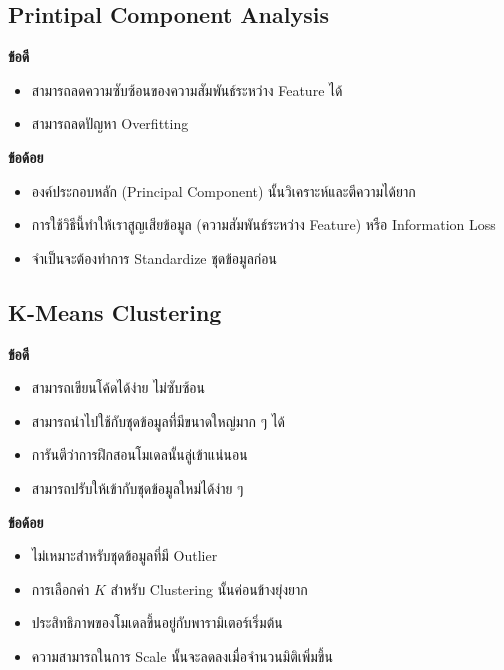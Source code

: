 \subsection{Printipal Component Analysis}
\label{ssec:pros_cons_pca}

\noindent \textbf{ข้อดี}
\begin{itemize}[topsep=0pt]
    \item สามารถลดความซับซ้อนของความสัมพันธ์ระหว่าง Feature ได้
    
    \item สามารถลดปัญหา Overfitting
\end{itemize}

\noindent \textbf{ข้อด้อย}
\begin{itemize}[topsep=0pt]
    \item องค์ประกอบหลัก (Principal Component) นั้นวิเคราะห์และตีความได้ยาก
    
    \item การใช้วิธีนี้ทำให้เราสูญเสียข้อมูล (ความสัมพันธ์ระหว่าง Feature) หรือ Information Loss
    
    \item จำเป็นจะต้องทำการ Standardize ชุดข้อมูลก่อน
\end{itemize}

\subsection{K-Means Clustering}
\label{ssec:pros_cons_kmeans}

\noindent \textbf{ข้อดี}
\begin{itemize}[topsep=0pt]
    \item สามารถเขียนโค้ดได้ง่าย ไม่ซับซ้อน
    
    \item สามารถนำไปใช้กับชุดข้อมูลที่มีขนาดใหญ่มาก ๆ ได้
    
    \item การันตีว่าการฝึกสอนโมเดลนั้นลู่เข้าแน่นอน
    
    \item สามารถปรับให้เข้ากับชุดข้อมูลใหม่ได้ง่าย ๆ
\end{itemize}

\noindent \textbf{ข้อด้อย}
\begin{itemize}[topsep=0pt]
    \item ไม่เหมาะสำหรับชุดข้อมูลที่มี Outlier
    
    \item การเลือกค่า $K$ สำหรับ Clustering นั้นค่อนข้างยุ่งยาก
    
    \item ประสิทธิภาพของโมเดลขึ้นอยู่กับพารามิเตอร์เริ่มต้น
    
    \item ความสามารถในการ Scale นั้นจะลดลงเมื่อจำนวนมิติเพิ่มขึ้น
\end{itemize}

